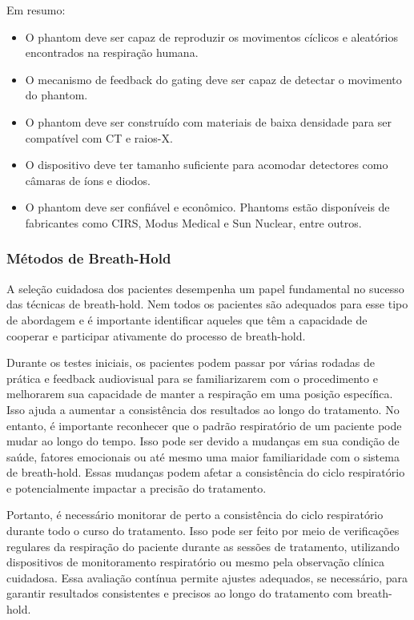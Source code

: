\documentclass[11pt,a4paper]{article}
\begin{document}
	Em resumo:

	\begin{itemize}
		\item O phantom deve ser capaz de reproduzir os movimentos cíclicos e aleatórios encontrados na respiração humana.
		\item O mecanismo de feedback do gating deve ser capaz de detectar o movimento do phantom.
		\item O phantom deve ser construído com materiais de baixa densidade para ser compatível com CT e raios-X.
		\item O dispositivo deve ter tamanho suficiente para acomodar detectores como câmaras de íons e diodos.
		\item O phantom deve ser confiável e econômico. Phantoms estão disponíveis de fabricantes como CIRS, Modus Medical e Sun Nuclear, entre outros.
	\end{itemize}

\subsubsection*{Métodos de Breath-Hold}

	A seleção cuidadosa dos pacientes desempenha um papel fundamental no sucesso das técnicas de breath-hold. Nem todos os pacientes são adequados para esse tipo de abordagem e é importante identificar aqueles que têm a capacidade de cooperar e participar ativamente do processo de breath-hold. 

	Durante os testes iniciais, os pacientes podem passar por várias rodadas de prática e feedback audiovisual para se familiarizarem com o procedimento e melhorarem sua capacidade de manter a respiração em uma posição específica. Isso ajuda a aumentar a consistência dos resultados ao longo do tratamento. No entanto, é importante reconhecer que o padrão respiratório de um paciente pode mudar ao longo do tempo. Isso pode ser devido a mudanças em sua condição de saúde, fatores emocionais ou até mesmo uma maior familiaridade com o sistema de breath-hold. Essas mudanças podem afetar a consistência do ciclo respiratório e potencialmente impactar a precisão do tratamento.

	Portanto, é necessário monitorar de perto a consistência do ciclo respiratório durante todo o curso do tratamento. Isso pode ser feito por meio de verificações regulares da respiração do paciente durante as sessões de tratamento, utilizando dispositivos de monitoramento respiratório ou mesmo pela observação clínica cuidadosa. Essa avaliação contínua permite ajustes adequados, se necessário, para garantir resultados consistentes e precisos ao longo do tratamento com breath-hold.
\end{document}
